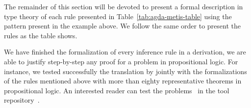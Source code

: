 \documentclass[../main.tex]{subfiles}
\begin{document}
The remainder of this section will be devoted to present a formal
description in type theory of each rule presented in
Table~\ref{tab:agda-metis-table} using the pattern present in the
example above.  We follow the same order to present the rules as the
table shows.











We have finished the formalization of every inference rule in
a \Metis derivation, we are able to justify step-by-step any proof
for a problem in propositional logic.
For instance, we tested successfully the translation by \Athena
jointly with the \Agda formalizations of the rules mentioned above
with more than eighty representative theorems in propositional
logic. An interested reader can test the
problems~\cite{Prieto-Cubides2017} in the \Athena tool
repository~\cite{Athena}.
\end{document}
